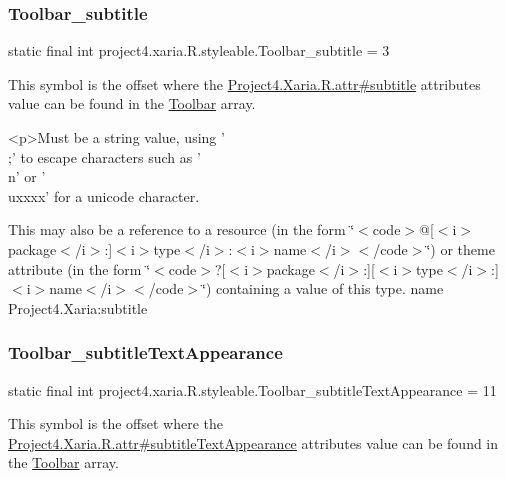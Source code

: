 \subsubsection{\texorpdfstring{Toolbar\+\_\+subtitle}{Toolbar\_subtitle}}
{\footnotesize\ttfamily static final int project4.\+xaria.\+R.\+styleable.\+Toolbar\+\_\+subtitle = 3\hspace{0.3cm}{\ttfamily [static]}}

This symbol is the offset where the \hyperlink{}{Project4.\+Xaria.\+R.\+attr\#subtitle} attribute\textquotesingle{}s value can be found in the \hyperlink{classproject4_1_1xaria_1_1R_1_1styleable_af6c30f9e9e086f6bf4e510669443fa59}{Toolbar} array.

\begin{DoxyVerb}      <p>Must be a string value, using '\\;' to escape characters such as '\\n' or '\\uxxxx' for a unicode character.
\end{DoxyVerb}
 

This may also be a reference to a resource (in the form \char`\"{}$<$code$>$@\mbox{[}$<$i$>$package$<$/i$>$\+:\mbox{]}$<$i$>$type$<$/i$>$\+:$<$i$>$name$<$/i$>$$<$/code$>$\char`\"{}) or theme attribute (in the form \char`\"{}$<$code$>$?\mbox{[}$<$i$>$package$<$/i$>$\+:\mbox{]}\mbox{[}$<$i$>$type$<$/i$>$\+:\mbox{]}$<$i$>$name$<$/i$>$$<$/code$>$\char`\"{}) containing a value of this type.  name Project4.\+Xaria\+:subtitle \mbox{\label{classproject4_1_1xaria_1_1R_1_1styleable_a4b938685d0218d8e307f8df758e2ca89}} 
\subsubsection{\texorpdfstring{Toolbar\+\_\+subtitle\+Text\+Appearance}{Toolbar\_subtitleTextAppearance}}
{\footnotesize\ttfamily static final int project4.\+xaria.\+R.\+styleable.\+Toolbar\+\_\+subtitle\+Text\+Appearance = 11\hspace{0.3cm}{\ttfamily [static]}}

This symbol is the offset where the \hyperlink{}{Project4.\+Xaria.\+R.\+attr\#subtitle\+Text\+Appearance} attribute\textquotesingle{}s value can be found in the \hyperlink{classproject4_1_1xaria_1_1R_1_1styleable_af6c30f9e9e086f6bf4e510669443fa59}{Toolbar} array.

